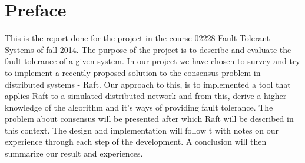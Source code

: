 \section{Preface} %
\label{sec:preface}

This is the report done for the project in the course 02228 Fault-Tolerant Systems of fall 2014. The purpose of the project is to describe and evaluate the fault tolerance of a given system. In our project we have chosen to survey and try to implement a recently proposed solution to the consensus problem in distributed systems - Raft.
Our approach to this, is to implemented a tool that applies Raft to a simulated distributed network and from this, derive a higher knowledge of the algorithm and it's ways of providing fault tolerance. The problem about consensus will be presented after which Raft will be described in this context. The design and implementation will follow t with notes on our experience through each step of the development.
A conclusion will then summarize our result and experiences.
